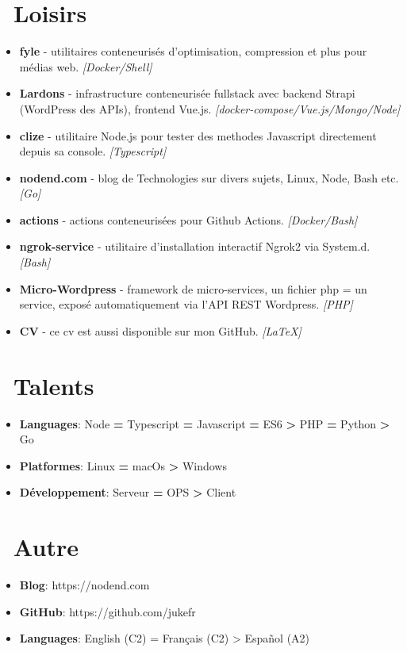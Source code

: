 \documentclass{resume}
\begin{document}
\section{\faGithub\ Loisirs}
\begin{itemize}
  \item \textbf{fyle} - utilitaires conteneurisés d'optimisation, compression et plus pour médias web. \textit{[Docker/Shell]}
  \item \textbf{Lardons} - infrastructure conteneurisée fullstack avec backend Strapi (WordPress des APIs), frontend Vue.js. \textit{[docker-compose/Vue.js/Mongo/Node]}
  \item \textbf{clize} - utilitaire Node.js pour tester des methodes Javascript directement depuis sa console. \textit{[Typescript]}
  \item \textbf{nodend.com} - blog de Technologies sur divers sujets, Linux, Node, Bash etc. \textit{[Go]}
  \item \textbf{actions} - actions conteneurisées pour Github Actions. \textit{[Docker/Bash]}
  \item \textbf{ngrok-service} - utilitaire d'installation interactif Ngrok2 via System.d. \textit{[Bash]}
  \item \textbf{Micro-Wordpress} - framework de micro-services, un fichier php = un service, exposé automatiquement via l'API REST Wordpress. \textit{[PHP]}
  \item \textbf{CV} - ce cv est aussi disponible sur mon GitHub. \textit{[LaTeX]}
\end{itemize}

\section{\faCogs\ Talents}
\begin{itemize}[parsep=0.5ex]
  \item \textbf{Languages}: Node \textbf{=} Typescript \textbf{=} Javascript \textbf{=} ES6 \textbf{>} PHP \textbf{=} Python \textbf{>} Go
  \item \textbf{Platformes}: Linux \textbf{=} macOs \textbf{>} Windows
  \item \textbf{Développement}: Serveur \textbf{=} OPS \textbf{>} Client
\end{itemize}

\section{\faInfo\ Autre}
\begin{itemize}[parsep=0.5ex]
  \item \textbf{Blog}: https://nodend.com
  \item \textbf{GitHub}: https://github.com/jukefr
  \item \textbf{Languages}: English (C2) = Français (C2) > Español (A2)
\end{itemize}
\end{document}
